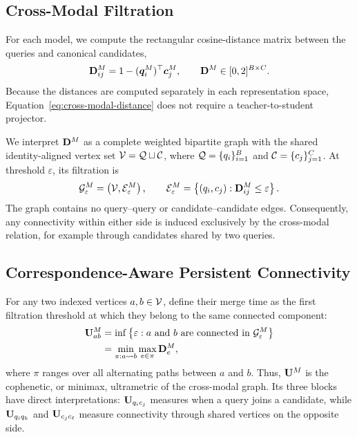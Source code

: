 \subsection{Cross-Modal Filtration}
\label{sec:method-filtration}

For each model, we compute the rectangular cosine-distance matrix between the
queries and canonical candidates,
\begin{equation}
    \mathbf{D}^{M}_{ij}
    = 1-(\bm{q}^{M}_i)^{\top}\bm{c}^{M}_j,
    \qquad
    \mathbf{D}^{M}\in[0,2]^{B\times C}.
    \label{eq:cross-modal-distance}
\end{equation}
Because the distances are computed separately in each representation space,
Equation~\eqref{eq:cross-modal-distance} does not require a
teacher-to-student projector.

We interpret $\mathbf{D}^{M}$ as a complete weighted bipartite graph with the
shared identity-aligned vertex set
$\mathcal{V}=\mathcal{Q}\sqcup\mathcal{C}$, where
$\mathcal{Q}=\{q_i\}_{i=1}^{B}$ and
$\mathcal{C}=\{c_j\}_{j=1}^{C}$. At threshold $\varepsilon$, its filtration is
\begin{equation}
    \mathcal{G}^{M}_{\varepsilon}
    = \left(
        \mathcal{V},
        \mathcal{E}^{M}_{\varepsilon}
      \right),
    \qquad
    \mathcal{E}^{M}_{\varepsilon}
    = \left\{(q_i,c_j):
      \mathbf{D}^{M}_{ij}\leq\varepsilon\right\}.
    \label{eq:bipartite-filtration}
\end{equation}
The graph contains no query--query or candidate--candidate edges. Consequently,
any connectivity within either side is induced exclusively by the
cross-modal relation, for example through candidates shared by two queries.

\subsection{Correspondence-Aware Persistent Connectivity}
\label{sec:method-merge-times}

For any two indexed vertices $a,b\in\mathcal{V}$, define their merge time as
the first filtration threshold at which they belong to the same connected
component:
\begin{align}
    \mathbf{U}^{M}_{ab}
    &= \inf\left\{\varepsilon:
       a\text{ and }b\text{ are connected in }
       \mathcal{G}^{M}_{\varepsilon}\right\} \\
    &= \min_{\pi:a\rightsquigarrow b}
       \max_{e\in\pi}\mathbf{D}^{M}_{e},
    \label{eq:merge-time}
\end{align}
where $\pi$ ranges over all alternating paths between $a$ and $b$. Thus,
$\mathbf{U}^{M}$ is the cophenetic, or minimax, ultrametric of the cross-modal
graph. Its three blocks have direct interpretations:
$\mathbf{U}_{q_i c_j}$ measures when a query joins a candidate, while
$\mathbf{U}_{q_i q_k}$ and $\mathbf{U}_{c_j c_\ell}$ measure connectivity through
shared vertices on the opposite side.

